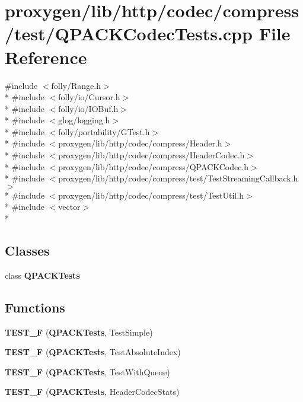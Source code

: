 \section{proxygen/lib/http/codec/compress/test/\+Q\+P\+A\+C\+K\+Codec\+Tests.cpp File Reference}
\label{QPACKCodecTests_8cpp}
{\ttfamily \#include $<$folly/\+Range.\+h$>$}\\*
{\ttfamily \#include $<$folly/io/\+Cursor.\+h$>$}\\*
{\ttfamily \#include $<$folly/io/\+I\+O\+Buf.\+h$>$}\\*
{\ttfamily \#include $<$glog/logging.\+h$>$}\\*
{\ttfamily \#include $<$folly/portability/\+G\+Test.\+h$>$}\\*
{\ttfamily \#include $<$proxygen/lib/http/codec/compress/\+Header.\+h$>$}\\*
{\ttfamily \#include $<$proxygen/lib/http/codec/compress/\+Header\+Codec.\+h$>$}\\*
{\ttfamily \#include $<$proxygen/lib/http/codec/compress/\+Q\+P\+A\+C\+K\+Codec.\+h$>$}\\*
{\ttfamily \#include $<$proxygen/lib/http/codec/compress/test/\+Test\+Streaming\+Callback.\+h$>$}\\*
{\ttfamily \#include $<$proxygen/lib/http/codec/compress/test/\+Test\+Util.\+h$>$}\\*
{\ttfamily \#include $<$vector$>$}\\*
\subsection*{Classes}
\begin{DoxyCompactItemize}
\item 
class {\bf Q\+P\+A\+C\+K\+Tests}
\end{DoxyCompactItemize}
\subsection*{Functions}
\begin{DoxyCompactItemize}
\item 
{\bf T\+E\+S\+T\+\_\+F} ({\bf Q\+P\+A\+C\+K\+Tests}, Test\+Simple)
\item 
{\bf T\+E\+S\+T\+\_\+F} ({\bf Q\+P\+A\+C\+K\+Tests}, Test\+Absolute\+Index)
\item 
{\bf T\+E\+S\+T\+\_\+F} ({\bf Q\+P\+A\+C\+K\+Tests}, Test\+With\+Queue)
\item 
{\bf T\+E\+S\+T\+\_\+F} ({\bf Q\+P\+A\+C\+K\+Tests}, Header\+Codec\+Stats)
\end{DoxyCompactItemize}


